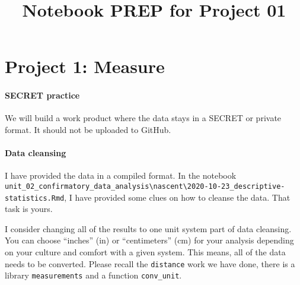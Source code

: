\documentclass[]{article}
\title{\textbf{\textcolor{WSU.crimson}{Notebook PREP for Project 01}}  }
\author{}
\date{}
\begin{document}
	
%    


{%
\setlength{\parindent}{0pt}
\thispagestyle{plain}
{\fontsize{18}{20}\selectfont\raggedright 
\maketitle  %

}

{
   \vskip 13.5pt\relax \normalsize\fontsize{11}{12} 
   
 

}

}






\vskip -8.5pt




\noindent  

\hypertarget{project-1-measure}{%
\section{Project 1: Measure}\label{project-1-measure}}

\hypertarget{secret-practice}{%
\paragraph{SECRET practice}\label{secret-practice}}

We will build a work product where the data stays in a SECRET or private
format. It should not be uploaded to GitHub.

\hypertarget{data-cleansing}{%
\paragraph{Data cleansing}\label{data-cleansing}}

I have provided the data in a compiled format. In the notebook
\texttt{unit\_02\_confirmatory\_data\_analysis\textbackslash{}nascent\textbackslash{}2020-10-23\_descriptive-statistics.Rmd},
I have provided some clues on how to cleanse the data. That task is
yours.

I consider changing all of the results to one unit system part of data
cleansing. You can choose ``inches'' (in) or ``centimeters'' (cm) for
your analysis depending on your culture and comfort with a given system.
This means, all of the data needs to be converted. Please recall the
\texttt{distance} work we have done, there is a library
\texttt{measurements} and a function \texttt{conv\_unit}.
\end{document}
